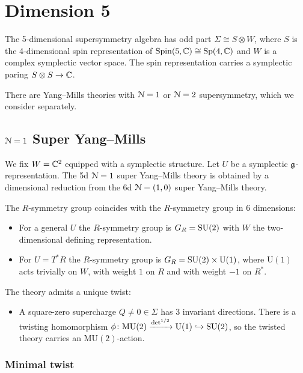 \documentclass[10pt, oneside]{article}
\newcommand{\MU}{\mathrm{MU}}
\renewcommand{\U}{\mathrm{U}}
\begin{document}
\section{Dimension 5}

The 5-dimensional supersymmetry algebra has odd part $\Sigma\cong S\otimes W$, where $S$ is the 4-dimensional spin representation of $\mathrm{Spin}(5, \mathbb C)\cong \mathrm{Sp}(4, \mathbb C)$ and $W$ is a complex symplectic vector space. The spin representation carries a symplectic paring $S\otimes S\rightarrow \mathbb C$.

There are Yang--Mills theories with $\mathcal N=1$ or $\mathcal N=2$ supersymmetry, which we consider separately.

\subsection{\texorpdfstring{$\mathcal{N} = 1$}{N=1} Super Yang--Mills}
\label{5d_1_section}

We fix $W = \mathbb C^2$ equipped with a symplectic structure. Let $U$ be a symplectic $\mathfrak g$-representation. The 5d $\mathcal N=1$ super Yang--Mills theory is obtained by a dimensional reduction from the 6d $\mathcal N=(1, 0)$ super Yang--Mills theory.

The $R$-symmetry group coincides with the $R$-symmetry group in 6 dimensions:
\begin{itemize}
\item For a general $U$ the $R$-symmetry group is $G_R=\mathrm{SU}(2)$ with $W$ the two-dimensional defining representation.

\item For $U=T^* R$ the $R$-symmetry group is $G_R=\SU(2)\times \U(1)$, where $\U(1)$ acts trivially on $W$, with weight $1$ on $R$ and with weight $-1$ on $R^*$.
\end{itemize}

The theory admits a unique twist:
\begin{itemize}
\item A square-zero supercharge $Q\neq 0\in\Sigma$ has 3 invariant directions. There is a twisting homomorphism $\phi\colon \MU(2)\xrightarrow{\det^{1/2}}\U(1)\hookrightarrow \SU(2)$, so the twisted theory carries an $\MU(2)$-action.
\end{itemize}

\subsubsection{Minimal twist}
\label{sect:5d1minimaltwist}
\end{document}

